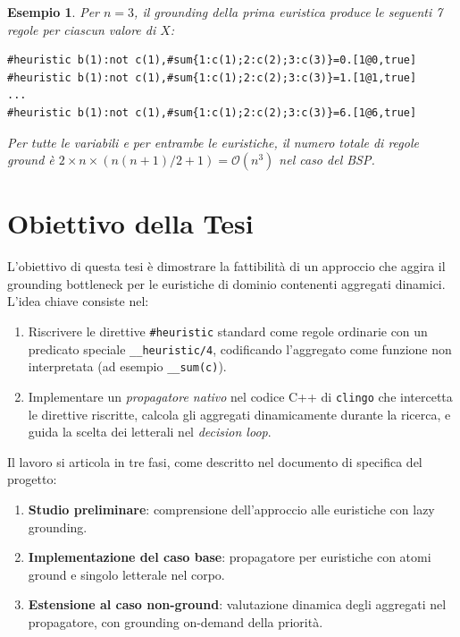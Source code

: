 \documentclass[a4paper,12pt,twoside,openright]{report}
\newtheorem{example}{Esempio}[chapter]
\newcommand{\clingo}{\texttt{clingo}}
\begin{document}
\begin{example}
Per $n=3$, il grounding della prima euristica produce le seguenti 7 regole per ciascun valore di $X$:
\begin{lstlisting}
#heuristic b(1):not c(1),#sum{1:c(1);2:c(2);3:c(3)}=0.[1@0,true]
#heuristic b(1):not c(1),#sum{1:c(1);2:c(2);3:c(3)}=1.[1@1,true]
...
#heuristic b(1):not c(1),#sum{1:c(1);2:c(2);3:c(3)}=6.[1@6,true]
\end{lstlisting}
Per tutte le variabili e per entrambe le euristiche, il numero totale di regole ground \`{e} $2 \times n \times (n(n+1)/2 + 1) = \mathcal{O}(n^3)$ nel caso del BSP.
\end{example}

\section{Obiettivo della Tesi}

L'obiettivo di questa tesi \`{e} dimostrare la fattibilit\`{a} di un approccio che aggira il grounding bottleneck per le euristiche di dominio contenenti aggregati dinamici. L'idea chiave consiste nel:
\begin{enumerate}
    \item Riscrivere le direttive \texttt{\#heuristic} standard come regole ordinarie con un predicato speciale \texttt{\_\_heuristic/4}, codificando l'aggregato come funzione non interpretata (ad esempio \texttt{\_\_sum(c)}).
    \item Implementare un \emph{propagatore nativo} nel codice C++ di \clingo{} che intercetta le direttive riscritte, calcola gli aggregati dinamicamente durante la ricerca, e guida la scelta dei letterali nel \emph{decision loop}.
\end{enumerate}

Il lavoro si articola in tre fasi, come descritto nel documento di specifica del progetto:
\begin{enumerate}
    \item \textbf{Studio preliminare}: comprensione dell'approccio alle euristiche con lazy grounding.
    \item \textbf{Implementazione del caso base}: propagatore per euristiche con atomi ground e singolo letterale nel corpo.
    \item \textbf{Estensione al caso non-ground}: valutazione dinamica degli aggregati nel propagatore, con grounding on-demand della priorit\`{a}.
\end{enumerate}
\end{document}
